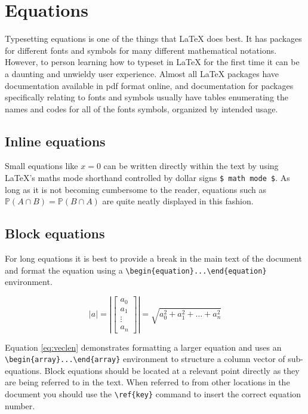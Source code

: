 \section{Equations}
	\label{sec:typesetting_equations}
	
	Typesetting equations is one of the things that LaTeX does best. It has packages for different fonts and symbols for many different mathematical notations. However, to person learning how to typeset in LaTeX for the first time it can be a daunting and unwieldy user experience. Almost all LaTeX packages have documentation available in pdf format online, and documentation for packages specifically relating to fonts and symbols usually have tables enumerating the names and codes for all of the fonts symbols, organized by intended usage. 
	
	\subsection{Inline equations}
	
	Small equations like $x = 0$ can be written directly within the text by using LaTeX's maths mode shorthand controlled by dollar signs \lstinline|$ math mode $|. As long as it is not becoming cumbersome to the reader, equations such as $\mathbb{P}({A} \cap {B}) = \mathbb{P}({B} \cap {A})$ are quite neatly displayed in this fashion. 
	
	\subsection{Block equations}
	
		For long equations it is best to provide a break in the main text of the document and format the equation using a \lstinline|\begin{equation}...\end{equation}| environment. 
		
		\begin{equation} \label{eq:veclen}
			\left\lvert a \right\rvert = \left\lvert \left[\begin{array}{c} a_0\\ a_1\\ \vdots\\ a_n\end{array}\right] \right\rvert = \sqrt{a_0^2 + a_1^2 + \hdots + a_n^2}
		\end{equation}
		
		Equation \ref{eq:veclen} demonstrates formatting a larger equation and uses an \lstinline|\begin{array}...\end{array}| environment to structure a column vector of sub-equations. Block equations should be located at a relevant point directly as they are being referred to in the text. When referred to from other locations in the document you should use the \lstinline|\ref{key}| command to insert the correct equation number.
		
